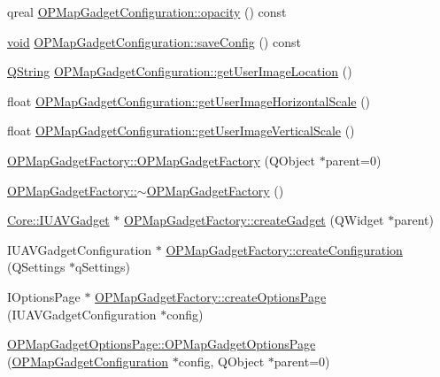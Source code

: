 \begin{DoxyCompactItemize}
qreal \hyperlink{group___o_p_map_plugin_ga9cc98eb40adba9b8b721443c2d15f01e}{\-O\-P\-Map\-Gadget\-Configuration\-::opacity} () const 
\item 
\hyperlink{group___u_a_v_objects_plugin_ga444cf2ff3f0ecbe028adce838d373f5c}{void} \hyperlink{group___o_p_map_plugin_ga7e3ff578900f8a9c8915321046955fc7}{\-O\-P\-Map\-Gadget\-Configuration\-::save\-Config} () const 
\item 
\hyperlink{group___u_a_v_objects_plugin_gab9d252f49c333c94a72f97ce3105a32d}{\-Q\-String} \hyperlink{group___o_p_map_plugin_ga2850b41441065cc1eefef00485f72459}{\-O\-P\-Map\-Gadget\-Configuration\-::get\-User\-Image\-Location} ()
\item 
float \hyperlink{group___o_p_map_plugin_gac4cdc48b3330d034dfd37d14fccf1a26}{\-O\-P\-Map\-Gadget\-Configuration\-::get\-User\-Image\-Horizontal\-Scale} ()
\item 
float \hyperlink{group___o_p_map_plugin_ga88c5753eccbe21cb720910a47efce3fe}{\-O\-P\-Map\-Gadget\-Configuration\-::get\-User\-Image\-Vertical\-Scale} ()
\item 
\hyperlink{group___o_p_map_plugin_ga348bc36551d757fe6accc824bda0f622}{\-O\-P\-Map\-Gadget\-Factory\-::\-O\-P\-Map\-Gadget\-Factory} (\-Q\-Object $\ast$parent=0)
\item 
\hyperlink{group___o_p_map_plugin_ga20558255cdd8731aa6edd40d797d2c02}{\-O\-P\-Map\-Gadget\-Factory\-::$\sim$\-O\-P\-Map\-Gadget\-Factory} ()
\item 
\hyperlink{class_core_1_1_i_u_a_v_gadget}{\-Core\-::\-I\-U\-A\-V\-Gadget} $\ast$ \hyperlink{group___o_p_map_plugin_ga185fdb89aa5cd90c3112f9f39333703c}{\-O\-P\-Map\-Gadget\-Factory\-::create\-Gadget} (\-Q\-Widget $\ast$parent)
\item 
\-I\-U\-A\-V\-Gadget\-Configuration $\ast$ \hyperlink{group___o_p_map_plugin_ga7f75947f3d08a110f8289998a41f44ee}{\-O\-P\-Map\-Gadget\-Factory\-::create\-Configuration} (\-Q\-Settings $\ast$q\-Settings)
\item 
\-I\-Options\-Page $\ast$ \hyperlink{group___o_p_map_plugin_gadde2c412f864fe77db6ea353a5e7071b}{\-O\-P\-Map\-Gadget\-Factory\-::create\-Options\-Page} (\-I\-U\-A\-V\-Gadget\-Configuration $\ast$config)
\item 
\hyperlink{group___o_p_map_plugin_ga23f0a8c69cfb41e42f3304d1b4a4cd34}{\-O\-P\-Map\-Gadget\-Options\-Page\-::\-O\-P\-Map\-Gadget\-Options\-Page} (\hyperlink{class_o_p_map_gadget_configuration}{\-O\-P\-Map\-Gadget\-Configuration} $\ast$config, \-Q\-Object $\ast$parent=0)
\item 

\end{DoxyCompactItemize}
